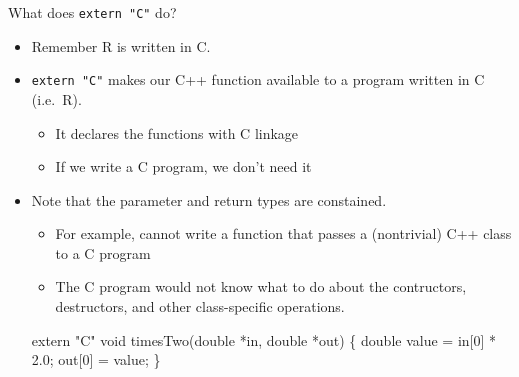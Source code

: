 \documentclass[ignorenonframetext,]{beamer}
\newenvironment{Shaded}{\begin{snugshade}}{\end{snugshade}}
\newcommand{\DataTypeTok}[1]{\textcolor[rgb]{0.13,0.29,0.53}{{#1}}}
\newcommand{\DecValTok}[1]{\textcolor[rgb]{0.00,0.00,0.81}{{#1}}}
\newcommand{\FloatTok}[1]{\textcolor[rgb]{0.00,0.00,0.81}{{#1}}}
\newcommand{\StringTok}[1]{\textcolor[rgb]{0.31,0.60,0.02}{{#1}}}
\newcommand{\NormalTok}[1]{{#1}}
\providecommand{\tightlist}{%
\setlength{\itemsep}{0pt}\setlength{\parskip}{0pt}}
\begin{document}
\begin{frame}[fragile]{What does \texttt{extern\ "C"} do?}

\begin{itemize}
\tightlist
\item
  Remember R is written in C.
\item
  \texttt{extern\ "C"} makes our C++ function available to a program
  written in C (i.e.~R).

  \begin{itemize}
  \tightlist
  \item
    It declares the functions with C linkage
  \item
    If we write a C program, we don't need it
  \end{itemize}
\item
  Note that the parameter and return types are constained.

  \begin{itemize}
  \tightlist
  \item
    For example, cannot write a function that passes a (nontrivial) C++
    class to a C program
  \item
    The C program would not know what to do about the contructors,
    destructors, and other class-specific operations.
  \end{itemize}

\begin{Shaded}
\begin{Highlighting}[]
\DataTypeTok{extern} \StringTok{"C"} \DataTypeTok{void}
  \NormalTok{timesTwo(}\DataTypeTok{double} \NormalTok{*in, }\DataTypeTok{double} \NormalTok{*out)}
\NormalTok{\{}
  \DataTypeTok{double} \NormalTok{value = in[}\DecValTok{0}\NormalTok{] * }\FloatTok{2.0}\NormalTok{;}
    \NormalTok{out[}\DecValTok{0}\NormalTok{] = value;}
\NormalTok{\}}
\end{Highlighting}
\end{Shaded}
\end{itemize}

\end{frame}
\end{document}
